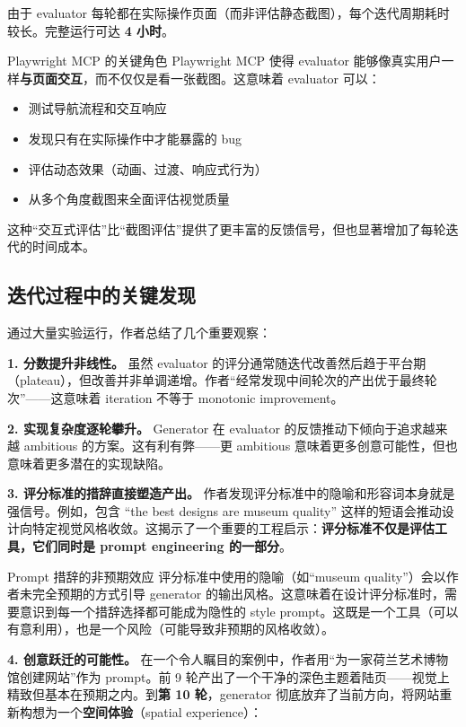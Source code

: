 由于 evaluator 每轮都在实际操作页面（而非评估静态截图），每个迭代周期耗时较长。完整运行可达 \textbf{4 小时}。

\begin{knowledgebox}{Playwright MCP 的关键角色}
Playwright MCP 使得 evaluator 能够像真实用户一样\textbf{与页面交互}，而不仅仅是看一张截图。这意味着 evaluator 可以：
\begin{itemize}[leftmargin=1.5em]
    \item 测试导航流程和交互响应
    \item 发现只有在实际操作中才能暴露的 bug
    \item 评估动态效果（动画、过渡、响应式行为）
    \item 从多个角度截图来全面评估视觉质量
\end{itemize}
这种``交互式评估''比``截图评估''提供了更丰富的反馈信号，但也显著增加了每轮迭代的时间成本。
\end{knowledgebox}

\subsection{迭代过程中的关键发现}

通过大量实验运行，作者总结了几个重要观察：

\textbf{1. 分数提升非线性。} 虽然 evaluator 的评分通常随迭代改善然后趋于平台期（plateau），但改善并非单调递增。作者``经常发现中间轮次的产出优于最终轮次''——这意味着 iteration 不等于 monotonic improvement。

\textbf{2. 实现复杂度逐轮攀升。} Generator 在 evaluator 的反馈推动下倾向于追求越来越 ambitious 的方案。这有利有弊——更 ambitious 意味着更多创意可能性，但也意味着更多潜在的实现缺陷。

\textbf{3. 评分标准的措辞直接塑造产出。} 作者发现评分标准中的隐喻和形容词本身就是强信号。例如，包含 ``the best designs are museum quality'' 这样的短语会推动设计向特定视觉风格收敛。这揭示了一个重要的工程启示：\textbf{评分标准不仅是评估工具，它们同时是 prompt engineering 的一部分}。

\begin{warningbox}{Prompt 措辞的非预期效应}
评分标准中使用的隐喻（如``museum quality''）会以作者未完全预期的方式引导 generator 的输出风格。这意味着在设计评分标准时，需要意识到每一个措辞选择都可能成为隐性的 style prompt。这既是一个工具（可以有意利用），也是一个风险（可能导致非预期的风格收敛）。
\end{warningbox}

\textbf{4. 创意跃迁的可能性。} 在一个令人瞩目的案例中，作者用``为一家荷兰艺术博物馆创建网站''作为 prompt。前 9 轮产出了一个干净的深色主题着陆页——视觉上精致但基本在预期之内。到\textbf{第 10 轮}，generator 彻底放弃了当前方向，将网站重新构想为一个\textbf{空间体验}（spatial experience）：

